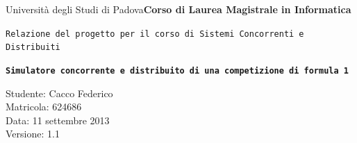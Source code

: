 \documentclass[a4paper,11pt, twoside]{book}
\begin{document}
  \thispagestyle{empty}
    
  \begin{flushright}
    {Università degli Studi di Padova}\linebreak[1]
    \textbf{Corso di Laurea \linebreak Magistrale in Informatica} \linebreak \linebreak \linebreak \linebreak
  \end{flushright}
  
  \begin{center}
    {\texttt{Relazione del progetto per il corso di Sistemi Concorrenti e Distribuiti \linebreak \linebreak \linebreak \linebreak \linebreak}}
  \end{center}
  
  \begin{center}
    \texttt{\huge{\textbf{Simulatore concorrente e distribuito di una competizione di formula 1}}} \linebreak \linebreak \linebreak \linebreak \linebreak \linebreak \linebreak \linebreak \linebreak
  \end{center}
  
  
  \begin{flushleft}
    Studente: Cacco Federico\\Matricola: 624686\\Data: 11 settembre 2013\\Versione: 1.1
  \end{flushleft}

  \newpage
  \setcounter{page}{1}

  \tableofcontents
  \newpage
  
\end{document}
